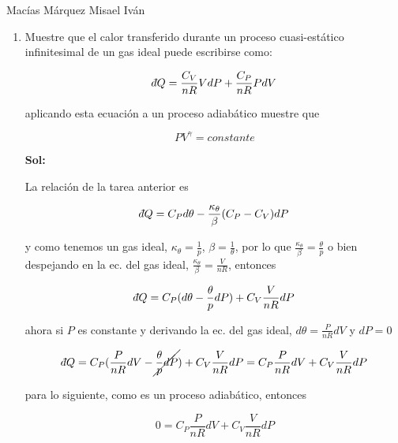 \documentclass[12pt,a4paper]{article}
\newcommand{\dbar}{\mathchar'26\mkern-12mu d}
\begin{document}
Macías Márquez Misael Iván

\begin{enumerate}






    \item Muestre que el calor transferido durante un proceso cuasi-estático infinitesimal de un gas ideal puede escribirse como:
    
    
    \begin{equation*}
        \dbar Q = \frac{C_V}{nR} VdP + \frac{C_P}{nR} PdV 
    \end{equation*}
    
    aplicando esta ecuación a un proceso adiabático muestre que
    
    \begin{equation*}
        PV^\gamma = constante
    \end{equation*}
    
    \textbf{Sol:}
    
     La relación de la tarea anterior es 
     
     \begin{equation*}
         \dbar Q = C_P d\theta - \frac{\kappa_\theta}{\beta}(C_P - C_V) dP
     \end{equation*}
    
    y como tenemos un gas ideal, $\kappa_\theta = \frac{1}{p}$, $\beta = \frac{1}{\theta}$, por lo que $\frac{\kappa_\theta}{\beta} = \frac{\theta}{p}$ o bien despejando en la ec. del gas ideal, $\frac{\kappa_\theta}{\beta} = \frac{V}{nR}$, entonces
    
    \begin{equation*}
         \dbar Q = C_P( d\theta - \frac{\theta}{p}dP)+ C_V\frac{V}{nR} dP
     \end{equation*}
     
     ahora si $P$ es constante y derivando la ec. del gas ideal, $d \theta = \frac{P}{nR}dV$ y $dP = 0$
     
     \begin{equation*}
         \dbar Q = C_P( \frac{P}{nR} dV - \cancel{\frac{\theta}{p}dP})+ C_V\frac{V}{nR} dP = C_P \frac{P}{nR} dV+ C_V\frac{V}{nR} dP
     \end{equation*}
     
     para lo siguiente, como es un proceso adiabático, entonces
     
     \begin{equation*}
         0 =C_P \frac{P}{nR} dV+ C_V\frac{V}{nR} dP
     \end{equation*}
     

\end{enumerate}
\end{document}
